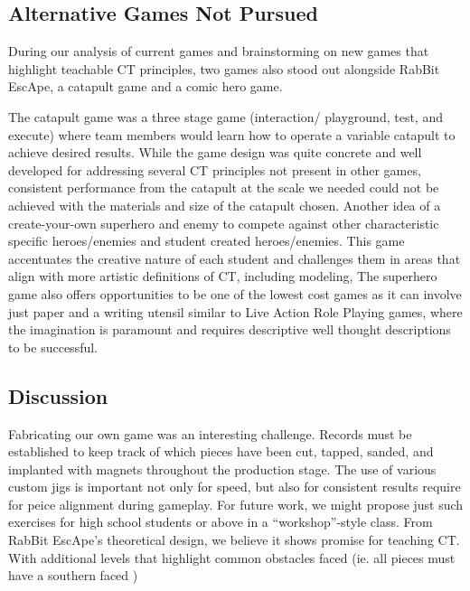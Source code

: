 \documentclass{acm_proc_article-sp}
\begin{document}
\subsection{Alternative Games Not Pursued}
\label{sec:terminated_games}
During our analysis of current games and brainstorming on new games that highlight teachable CT principles, two games also stood out alongside RabBit EscApe, a catapult game and a comic hero game.

The catapult game was a three stage game (interaction/ playground, test, and execute) where team members would learn how to operate a variable catapult to achieve desired results.
While the game design was quite concrete and well developed for addressing several CT principles not present in other games, consistent performance from the catapult at the scale we needed could not be achieved with the materials and size of the catapult chosen.
Another idea of a create-your-own superhero and enemy to compete against other characteristic specific heroes/enemies and student created heroes/enemies.
This game accentuates the creative nature of each student and challenges them in areas that align with more artistic definitions of CT, including modeling, 
The superhero game also offers opportunities to be one of the lowest cost games as it can involve just paper and a writing utensil similar to Live Action Role Playing games, where the imagination is paramount and requires descriptive well thought descriptions to be successful.

\subsection{Discussion}
\label{sec:discussion}
\sloppy Fabricating our own game was an interesting challenge.
Records must be established to keep track of which pieces have been cut, tapped, sanded, and implanted with magnets throughout the production stage.
The use of various custom jigs is important not only for speed, but also for consistent results require for peice alignment during gameplay.
For future work, we might propose just such exercises for high school students or above in a ``workshop''-style class.
From RabBit EscApe's theoretical design, we believe it shows promise for teaching CT.  With additional levels that highlight common obstacles faced (ie. all pieces must have a southern faced )
\end{document}
